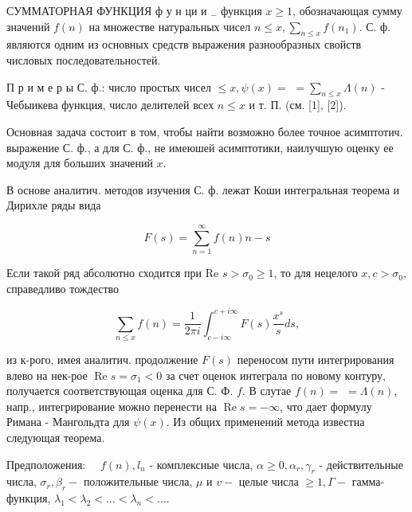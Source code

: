 \documentclass[10pt]{article}
\begin{document}
СУММАТОРНАЯ ФУНКЦИЯ ф у н ци и $\boldsymbol{}_{-}$ функция $x \geqslant 1$, обозначающая сумму значений $f(n)$ на множестве натуральных чисел $n \leqslant x, \sum_{n \leqslant x} f\left(n_{1}\right)$. С. ф. являются одним из основных средств выражения разнообразных свойств числовых последовательностей.



П р и м е р ы С. ф.: число простых чисел $\leqslant x, \psi(x)=$ $=\sum_{n \leqslant x} \Lambda(n)$ - Чебыикева функция, число делителей всех $n \leqslant x$ и т. П. (см. [1], [2]).



Основная задача состоит в том, чтобы найти возможно более точное асимптотич. выражение С. ф., а для С. ф., не имеюшей асимптотики, наилучшую оценку ее модуля для больших значений $x$.



В основе аналитич. методов изучения С. ф. лежат Коши интегральная теорема и Дирихле ряды вида



\[

F(s)=\sum_{n=1}^{\infty} f(n) n-s

\]



Если такой ряд абсолютно сходится при Re $s>\sigma_{0} \geqslant 1$, то для нецелого $x, c>\sigma_{0}$, справедливо тождество



\[

\sum_{n \leqslant x} f(n)=\frac{1}{2 \pi i} \int_{c-i \infty}^{c+i \infty} F(s) \frac{x^{s}}{s} d s,

\]



из к-рого, имея аналитич. продолжение $F(s)$ переносом пути интегрирования влево на нек-рое $\operatorname{Re} s=\sigma_{1}<0$ за счет оценок интеграла по новому контуру, получается соответствующая оценка для С. Ф. $f$. В слутае $f(n)=$ $=\Lambda(n)$, напр., интегрирование можно перенести на $\operatorname{Re} s=-\infty$, что дает формулу Римана - Мангольдта для $\psi(x)$. Из общих применений метода известна следующая теорема.



Предположения: $\quad f(n), l_{n}$ - комплексные числа, $\alpha \geqslant 0, \alpha_{r}, \gamma_{r}$ - действительные числа, $\sigma_{r}, \beta_{r}-$ положительные числа, $\mu$ и $v-$ целые числа $\geqslant 1, \Gamma-$ гамма-функция, $\lambda_{1}<\lambda_{2}<\ldots<\lambda_{n}<\ldots$.
\end{document}
